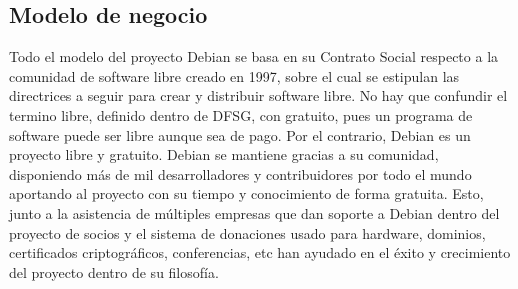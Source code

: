 \subsection{Modelo de negocio}
Todo el modelo del proyecto Debian se basa en su Contrato Social respecto a la comunidad de software libre creado en 1997, sobre el cual se estipulan las directrices a seguir para crear y distribuir software libre. \cite{DebCS}
\newline
\newline
No hay que confundir el termino libre, definido dentro de DFSG, con gratuito, pues un programa de software puede ser libre aunque sea de pago. Por el contrario, Debian es un proyecto libre y gratuito.
\newline
\newline
Debian se mantiene gracias a su comunidad, disponiendo más de mil desarrolladores y contribuidores por todo el mundo aportando al proyecto con su tiempo y conocimiento de forma gratuita. Esto, junto a la asistencia de múltiples empresas que dan soporte a Debian dentro del proyecto de socios \cite{DebPP} y el sistema de donaciones \cite{DebDon} usado para hardware, dominios, certificados criptográficos, conferencias, etc han ayudado en el éxito y crecimiento del proyecto dentro de su filosofía.

